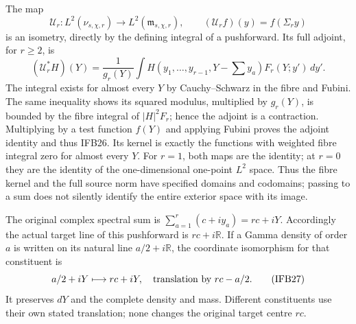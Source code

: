 \documentclass[11pt,a4paper]{article}
\begin{document}
The map
\[
 \mathcal U_r:L^2(\nu_{s,\chi,r})\longrightarrow
                 L^2(\mathfrak m_{s,\chi,r}),\qquad
 (\mathcal U_r f)(y)=f(\Sigma_r y)
 \tag{IFB25}
\]
is an isometry, directly by the defining integral of a pushforward.
Its full adjoint, for $r\geq2$, is
\[
 (\mathcal U_r^*H)(Y)
 =\frac1{g_r(Y)}\int H(y_1,\ldots,y_{r-1},Y-\textstyle\sum y_a)
                         F_r(Y;y')\,dy'.
 \tag{IFB26}
\]
The integral exists for almost every $Y$ by Cauchy--Schwarz in the
fibre and Fubini. The same inequality shows its squared modulus,
multiplied by $g_r(Y)$, is bounded by the fibre integral of
$|H|^2F_r$; hence the adjoint is a contraction. Multiplying by a
test function $f(Y)$ and applying Fubini proves the adjoint identity
and thus IFB26. Its kernel is exactly the functions with weighted
fibre integral zero for almost every $Y$. For $r=1$, both maps are
the identity; at $r=0$ they are the identity of the one-dimensional
one-point $L^2$ space. Thus the fibre kernel and the full source
norm have specified domains and codomains; passing to a sum does
not silently identify the entire exterior space with its image.

The original complex spectral sum is
$\sum_{a=1}^r(c+iy_a)=rc+iY$. Accordingly the actual target line
of this pushforward is $rc+i\mathbb R$. If a Gamma density of
order $a$ is written on its natural line $a/2+i\mathbb R$, the
coordinate isomorphism for that constituent is
\[
 a/2+iY\longmapsto rc+iY,
 \quad\hbox{translation by }rc-a/2.
 \tag{IFB27}
\]
It preserves $dY$ and the complete density and mass. Different
constituents use their own stated translation; none changes the
original target centre $rc$.
\end{document}
